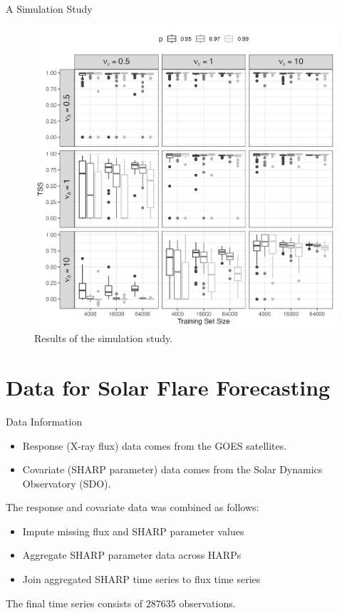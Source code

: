 \documentclass{beamer}
\begin{document}
\begin{frame}{A Simulation Study}
    \begin{figure}[h!]
        \centering
        \includegraphics[scale=0.4]{sim_study07.png}
        \caption{Results of the simulation study.}
        \label{fig:sim_study07}
    \end{figure}
\end{frame}

\section{Data for Solar Flare Forecasting}

\begin{frame}{Data Information}
    \begin{itemize}
        \item Response (X-ray flux) data comes from the GOES satellites.
        \item Covariate (SHARP parameter) data comes from the Solar Dynamics Observatory (SDO).
    \end{itemize}

    The response and covariate data was combined as follows:
    \begin{itemize}
        \item Impute missing flux and SHARP parameter values
        \item Aggregate SHARP parameter data across HARPs 
        \item Join aggregated SHARP time series to flux time series
    \end{itemize}
    The final time series consists of $\num[group-separator={,}]{287635}$ observations.
\end{frame}
\end{document}
